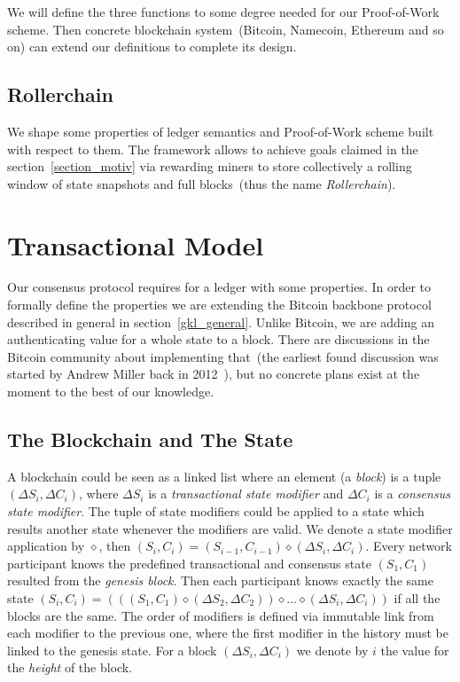 \documentclass[conference,compsoc]{IEEEtran}
\begin{document}
We will define the three functions to some degree needed for our Proof-of-Work scheme. Then concrete blockchain system~(Bitcoin, Namecoin, Ethereum and so on) can extend our definitions to complete its design. 

\subsection{Rollerchain}

We shape some properties of ledger semantics and Proof-of-Work scheme built with respect to them. The framework allows to achieve goals claimed in the section~\ref{section_motiv} via rewarding miners to store collectively a rolling window of state snapshots and full blocks~(thus the name \textit{Rollerchain}).



\section{Transactional Model}
\label{tx_model}

Our consensus protocol requires for a ledger with some properties. In order to formally define the properties we are extending the Bitcoin backbone protocol described in general in section~\ref{gkl_general}. Unlike Bitcoin, we are adding an authenticating value for a whole state to a block. There are discussions in the Bitcoin community about implementing that~(the earliest found discussion was started by Andrew Miller back in 2012~\cite{utxoset}), but no concrete plans exist at the moment to the best of our knowledge.

\subsection{The Blockchain and The State}

A blockchain could be seen as a linked list where an element (a \textit{block}) is a tuple \((\Delta S_i, \Delta C_i)\), where \(\Delta S_i\) is a \textit{transactional state modifier} and \(\Delta C_i\) is a \textit{consensus state modifier}. The tuple of state modifiers could be applied to a state which results another state whenever the modifiers are valid. We denote a state modifier application by \(\diamond\), then \((S_i,C_i) = (S_{i-1},C_{i-1}) \diamond (\Delta S_i, \Delta C_i) \). Every network participant knows the predefined  transactional and consensus state \((S_1, C_1)\) resulted from the \textit{genesis block}. Then each participant knows exactly the same state \((S_i,C_i) = (((S_1, C_1) \diamond (\Delta S_2, \Delta C_2)) \diamond \dots \diamond (\Delta S_i, \Delta C_i)) \) if all the blocks are the same. The order of modifiers is defined via immutable  link from each modifier to the previous one, where the first modifier in the history must be linked to the genesis state. For a block \((\Delta S_i, \Delta C_i)\) we denote by \(i\) the value for the \textit{height} of the block.
\end{document}
